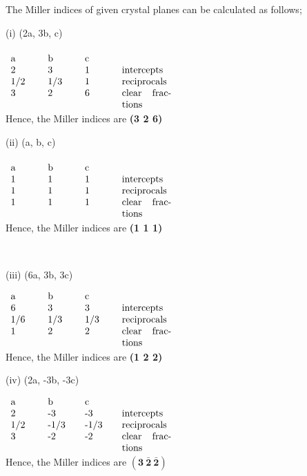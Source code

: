 \begin{answer}
	The Miller indices of given crystal planes can be calculated as follows;\\
	\vspace{0.6cm}
	\begin{minipage}{0.45\textwidth}
		(i) (2a, 3b, c)\\\\
		$\begin{array}{p{1cm} p{1cm} p{1cm} p{1.8cm}}
		a&b&c&\\
		2&3&1&intercepts\\
		1/2& 1/3&1& reciprocals\\
		3 & 2& 6& clear fractions
		\end{array}	$\\
		Hence, the Miller indices are \textbf{(3 2 6)}
	\end{minipage}
	\begin{minipage}{0.45\textwidth}
		(ii) (a, b, c)\\\\
		$\begin{array}{p{1cm} p{1cm} p{1cm} p{1.8cm}}
		a&b&c&\\
		1&1&1&intercepts\\
		1& 1&1& reciprocals\\
		1 & 1& 1& clear fractions
		\end{array}	$\\
		Hence, the Miller indices are \textbf{(1 1 1)}
	\end{minipage}	\\
	\begin{minipage}{0.45\textwidth}
		(iii) (6a, 3b, 3c)
		
		$\begin{array}{p{1cm} p{1cm} p{1cm} p{1.8cm}}
		a&b&c&\\
		6&3&3&intercepts\\
		1/6& 1/3&1/3& reciprocals\\
		1 & 2& 2& clear fractions
		\end{array}	$\\
		Hence, the Miller indices are \textbf{(1 2 2)}
	\end{minipage}
	\begin{minipage}{0.45\textwidth}
		(iv) (2a, -3b, -3c)
		
		$\begin{array}{p{1cm} p{1cm} p{1cm} p{1.8cm}}
		a&b&c&\\
		2&-3&-3&intercepts\\
		1/2& -1/3&-1/3& reciprocals\\
		3 & -2& -2& clear fractions
		\end{array}	$\\
		Hence, the Miller indices are $\mathbf{(3\  \bar{2}\ \bar{2})}$ 
	\end{minipage}		
\end{answer} 
